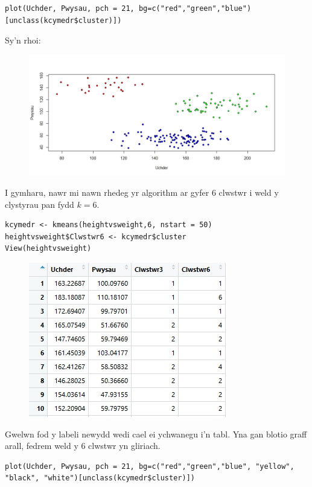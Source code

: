 \begin{verbatim}
plot(Uchder, Pwysau, pch = 21, bg=c("red","green","blue")[unclass(kcymedr$cluster)])
\end{verbatim}

Sy'n rhoi:

\begin{figure}[H]
\begin{center}
\includegraphics[width=0.5\linewidth]{../img/3clwstwrR.jpeg}
\end{center}
\end{figure}

I gymharu, nawr mi nawn rhedeg yr algorithm ar gyfer 6 clwstwr i weld y clystyrau pan fydd $k=6$. 

\begin{verbatim}
kcymedr <- kmeans(heightvsweight,6, nstart = 50)
heightvsweight$Clwstwr6 <- kcymedr$cluster
View(heightvsweight)
\end{verbatim}

\begin{figure}[H]
\begin{center}
\includegraphics[width=0.5\linewidth]{../img/Data6_yn_R.jpg}
\end{center}
\end{figure}

Gwelwn fod y labeli newydd wedi cael ei ychwanegu i'n tabl. Yna gan blotio graff arall, fedrem weld y 6 clwstwr yn gliriach.

\begin{verbatim}
plot(Uchder, Pwysau, pch = 21, bg=c("red","green","blue", "yellow", "black", "white")[unclass(kcymedr$cluster)])
\end{verbatim}

